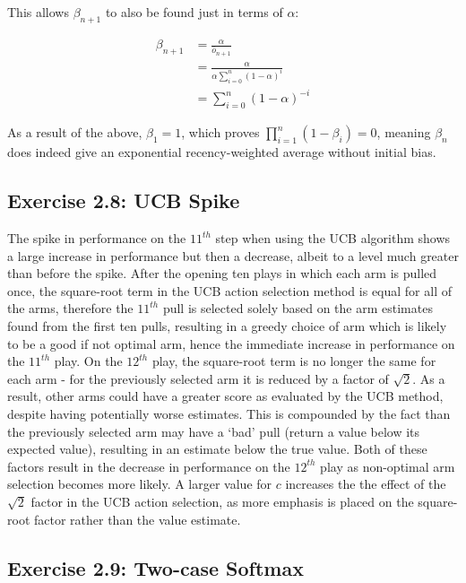 This allows $\beta_{n+1}$ to also be found just in terms of $\alpha$:

\vspace{-6mm}
\begin{align*}
\beta_{n+1} &= \frac{\alpha}{\bar{o}_{n+1}} \\
&= \frac{\alpha}{\alpha\sum_{i=0}^{n}(1-\alpha)^i} \\
&= \sum_{i=0}^{n}(1-\alpha)^{-i}
\end{align*}

As a result of the above, $\beta_1 = 1$, which proves $\prod_{i=1}^{n}(1-\beta_i) = 0$, meaning $\beta_n$ does indeed give an exponential recency-weighted average without initial bias.

\subsection*{Exercise 2.8: UCB Spike}

The spike in performance on the $11^{th}$ step when using the UCB algorithm shows a large increase in performance but then a decrease, albeit to a level much greater than before the spike. After the opening ten plays in which each arm is pulled once, the square-root term in the UCB action selection method is equal for all of the arms, therefore the $11^{th}$ pull is selected solely based on the arm estimates found from the first ten pulls, resulting in a greedy choice of arm which is likely to be a good if not optimal arm, hence the immediate increase in performance on the $11^{th}$ play. On the $12^{th}$ play, the square-root term is no longer the same for each arm - for the previously selected arm it is reduced by a factor of $\sqrt{2}$. As a result, other arms could have a greater score as evaluated by the UCB method, despite having potentially worse estimates. This is compounded by the fact than the previously selected arm may have a `bad' pull (return a value below its expected value), resulting in an estimate below the true value. Both of these factors result in the decrease in performance on the $12^{th}$ play as non-optimal arm selection becomes more likely. A larger value for $c$ increases the the effect of the $\sqrt{2}$ factor in the UCB action selection, as more emphasis is placed on the square-root factor rather than the value estimate. 

\subsection*{Exercise 2.9: Two-case Softmax}

